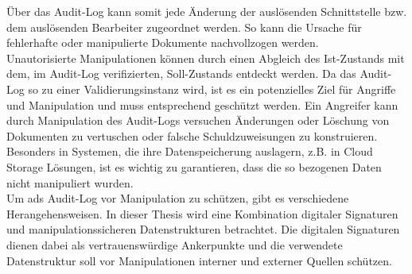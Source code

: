 Über das Audit-Log kann somit jede Änderung der auslösenden Schnittstelle bzw. dem auslösenden Bearbeiter zugeordnet werden. So kann die Ursache für fehlerhafte oder manipulierte Dokumente nachvollzogen werden.\\
Unautorisierte Manipulationen können durch einen Abgleich des Ist-Zustands mit dem, im Audit-Log verifizierten, Soll-Zustands entdeckt werden. Da das Audit-Log so zu einer Validierungsinstanz wird, ist es ein potenzielles Ziel für Angriffe und Manipulation und muss entsprechend geschützt werden. Ein Angreifer kann durch Manipulation des Audit-Logs versuchen Änderungen oder Löschung von Dokumenten zu vertuschen oder falsche Schuldzuweisungen zu konstruieren. Besonders in Systemen, die ihre Datenspeicherung auslagern, z.B. in Cloud Storage Lösungen, ist es wichtig zu garantieren, dass die so bezogenen Daten nicht manipuliert wurden.\cite{6726483}\\
Um ads Audit-Log vor Manipulation zu schützen, gibt es verschiedene Herangehensweisen. In dieser Thesis wird eine Kombination digitaler Signaturen und manipulationssicheren Datenstrukturen betrachtet. Die digitalen Signaturen dienen dabei als vertrauenswürdige Ankerpunkte und die verwendete Datenstruktur soll vor Manipulationen interner und externer Quellen schützen.

